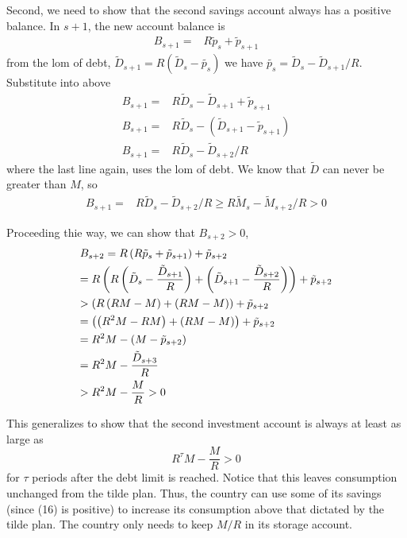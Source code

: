 \documentclass[11pt, pdftex]{article}
\begin{document}
Second, we need to show that the second savings account always has a positive balance. In $s+1$, the new account balance is
\begin{align}\label{}
  B_{s+1} =& R\tilde{p}_s+\tilde{p}_{s+1}
\end{align}
from the lom of debt, $\tilde{D}_{s+1}=R(\tilde{D}_s-\tilde{p_s})$ we have $\tilde{p_s}=\tilde{D}_{s}-\tilde{D}_{s+1}/R$. Substitute into above
\begin{align}\label{}
  B_{s+1} =& R\tilde{D}_s-\tilde{D}_{s+1}+\tilde{p}_{s+1}\\
  B_{s+1} =& R\tilde{D}_s-(\tilde{D}_{s+1}-\tilde{p}_{s+1})\\
  B_{s+1} =& R\tilde{D}_s-\tilde{D}_{s+2}/R
\end{align}
where the last line again, uses the lom of debt. We know that $\tilde{D}$ can never be greater than $M$, so
\begin{align}
B_{s+1} =& R\tilde{D}_s-\tilde{D}_{s+2}/R \geq R\tilde{M}_s-\tilde{M}_{s+2}/R>0
\end{align}

Proceeding thie way, we can show that $B_{s+2}>0$,
	\[\begin{gathered}
  {B_{s + 2}} =R\left( {R{{\tilde p}_s} + {{\tilde p}_{s + 1}}} \right) + {{\tilde p}_{s + 2}} \hfill \\
     = R\left( {R\left( {{{\tilde D}_s} - \frac{{{{\tilde D}_{s + 1}}}}{R}} \right) + \left( {{{\tilde D}_{s + 1}} - \frac{{{{\tilde D}_{s + 2}}}}{R}} \right)} \right) + {{\tilde p}_{s + 2}} \hfill \\
     > \left( {R\left( {RM - M} \right) + \left( {RM - M} \right)} \right) + {{\tilde p}_{s + 2}} \hfill \\
     = \left( {\left( {{R^2}M - RM} \right) + \left( {RM - M} \right)} \right) + {{\tilde p}_{s + 2}} \hfill \\
     =  {R^2}M - \left( {M - {{\tilde p}_{s + 2}}} \right) \hfill \\
     =  {R^2}M - \frac{{{{\tilde D}_{s + 3}}}}{R} \hfill \\
     >  {R^2}M - \frac{M}{R} > 0 \hfill \\
\end{gathered} \]

This generalizes to show that the second investment account is always at least as large as
	\[ {R^\tau }M - \frac{M}{R} > 0\]
for $\tau $ periods after the debt limit is reached.  Notice that this leaves consumption unchanged from the tilde plan.  Thus, the country can use some of its savings (since (16) is positive) to increase its consumption above that dictated by the tilde plan.    The country only needs to keep $M/R$ in its storage account.
\end{document}
